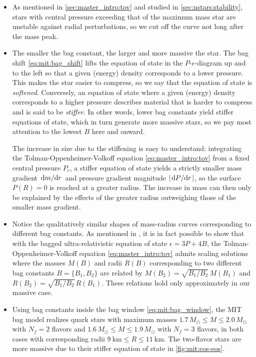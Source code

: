 \begin{itemize}
\item As mentioned in \cref{sec:master_intro:tov} and studied in \cref{sec:nstars:stability},
      stars with central pressure exceeding that of the maximum mass star are unstable against radial perturbations,
      so we cut off the curve not long after the mass peak.
\item The smaller the bag constant, the larger and more massive the star.
      The bag shift \eqref{eq:mit:bag_shift} lifts the equation of state in the $P$-$\epsilon$-diagram up and to the left
      so that a given (energy) density corresponds to a lower pressure.
      This makes the star easier to compress, so we say that the equation of state is \emph{softened}.
      Conversely, an equation of state where a given (energy) density corresponds to a higher pressure
      describes material that is harder to compress and is said to be \emph{stiffer}.
      In other words, lower bag constants yield stiffer equations of state,
      which in turn generate more massive stars,
      so we pay most attention to the lowest $B$ here and onward.

      The increase in size due to the stiffening is easy to understand:
      integrating the Tolman-Oppenheimer-Volkoff equation \eqref{eq:master_intro:tov} from a fixed central pressure $P_c$,
      a stiffer equation of state yields a strictly smaller mass gradient $\odv{m}/{r}$ and pressure gradient magnitude $\abs{\odv{P}/{r}}$,
      so the surface $P(R)=0$ is reached at a greater radius.
      The increase in mass can then only be explained by the effects of the greater radius outweighing those of the smaller mass gradient.
\item Notice the qualitatively similar shapes of mass-radius curves corresponding to different bag constants.
      As mentioned in \cite[equation 8.29]{ref:glendenning},
      it is in fact possible to show that with the bagged ultra-relativistic equation of state $\epsilon = 3P + 4B$,
      the Tolman-Oppenheimer-Volkoff equation \eqref{eq:master_intro:tov} admits scaling solutions
      where the masses $M(B)$ and radii $R(B)$ corresponding to two different bag constants $B=\{B_1,B_2\}$
      are related by $M(B_2) = \sqrt{B_1/B_2} \, M(B_1)$ and $R(B_2) = \sqrt{B_1/B_2} \, R(B_1)$.
      These relations hold only approximately in our massive case.
\item Using bag constants inside the bag window \eqref{eq:mit:bag_window},
      the MIT bag model realizes quark stars with maximum masses
      $1.7 \, M_\odot \leq M \leq 2.0 \, M_\odot$ with $N_f=2$ flavors
      and $1.6 \, M_\odot \leq M \leq 1.9 \, M_\odot$ with $N_f=3$ flavors,
      in both cases with corresponding radii $\SI{9}{\kilo\meter} \leq R \leq \SI{11}{\kilo\meter}$.
      The two-flavor stars are more massive due to their stiffer equation of state in \cref{fig:mit:eos-eos}.
\end{itemize}

